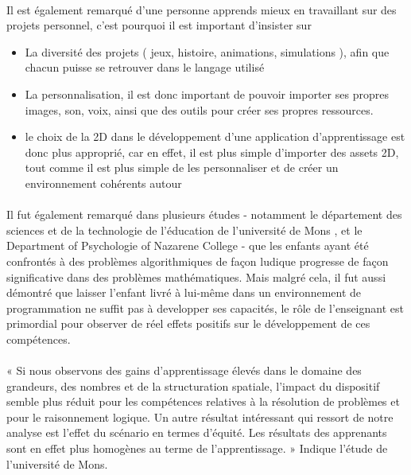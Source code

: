 \documentclass[a4paper]{article}
\begin{document}
\paragraph{}
Il est également remarqué d’une personne apprends mieux en travaillant sur des projets personnel, c’est pourquoi il est important d’insister sur
\begin{itemize}
\item La diversité des projets ( jeux, histoire, animations, simulations ), afin que chacun puisse se retrouver dans le langage utilisé
\item La personnalisation, il est donc important de pouvoir importer ses propres images, son, voix, ainsi que des outils pour créer ses propres ressources.
\item le choix de la 2D dans le développement d’une application d’apprentissage est donc plus approprié, car en effet, il est plus simple d’importer des assets 2D, tout comme il est plus simple de les personnaliser et de créer un environnement cohérents autour
\end{itemize}

\paragraph{}
Il fut également remarqué dans plusieurs études - notamment le département des sciences et de la technologie de l’éducation de l’université de Mons \cite{temperman:halshs-01092656}, et le Department of Psychologie of Nazarene College \cite{degelman1986concept} - que les enfants ayant été confrontés à des problèmes algorithmiques de façon ludique progresse de façon significative dans des problèmes mathématiques. Mais malgré cela, il fut aussi démontré que laisser l’enfant livré à lui-même dans un environnement de programmation ne suffit pas à developper ses capacités, le rôle de l’enseignant est primordial pour observer de réel effets positifs sur le développement de ces compétences.

\paragraph{}
« Si nous observons des gains d’apprentissage élevés dans le domaine des grandeurs, des nombres et de la structuration spatiale, l'impact du dispositif semble plus réduit pour les compétences relatives à la résolution de problèmes et pour le raisonnement logique. Un autre résultat intéressant qui ressort de notre analyse est l'effet du scénario en termes d’équité. Les résultats des apprenants sont en effet plus homogènes au terme de l’apprentissage. » \cite{temperman:halshs-01092656}  Indique l’étude de l’université de Mons.
\end{document}
